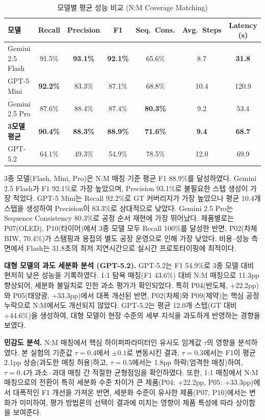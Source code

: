 \documentclass[conference]{IEEEtran}
\begin{document}
\begin{table}[!t]
\caption{모델별 평균 성능 비교 (N:M Coverage Matching)}
\label{tab:model_performance}
\centering
\begin{tabular}{l c c c c c c}
\hline
\textbf{모델} & \textbf{Recall} & \textbf{Precision} & \textbf{F1} & \textbf{Seq.\ Cons.} & \textbf{Avg.\ Steps} & \textbf{Latency (s)} \\
\hline
Gemini 2.5 Flash & 91.5\% & \textbf{93.1\%} & \textbf{92.1\%} & 65.6\% & 8.7 & \textbf{31.8} \\
GPT-5 Mini & \textbf{92.2\%} & 83.3\% & 87.1\% & 68.8\% & 10.4 & 120.9 \\
Gemini 2.5 Pro & 87.6\% & 88.4\% & 87.4\% & \textbf{80.3\%} & 9.2 & 53.4 \\
\hline
\textbf{3모델 평균} & \textbf{90.4\%} & \textbf{88.3\%} & \textbf{88.9\%} & \textbf{71.6\%} & \textbf{9.4} & \textbf{68.7} \\
\hline
GPT-5.2 & 64.1\% & 49.3\% & 54.9\% & 78.5\% & 12.0 & 69.9 \\
\hline
\end{tabular}
\end{table}

3종 모델(Flash, Mini, Pro)은 N:M 매칭 기준 평균 F1 88.9\%를 달성하였다. Gemini 2.5 Flash가 F1 92.1\%로 가장 높았으며, Precision 93.1\%로 불필요한 스텝 생성이 가장 적었다. GPT-5 Mini는 Recall 92.2\%로 GT 커버리지가 가장 높았으나 평균 10.4개 스텝을 생성하여 Precision이 83.3\%로 상대적으로 낮았다. Gemini 2.5 Pro는 Sequence Consistency 80.3\%로 공정 순서 재현에 가장 뛰어났다. 제품별로는 P07(OLED), P10(타이어)에서 3종 모델 모두 Recall 100\%를 달성한 반면, P02(차체 BIW, 70.4\%)가 스탬핑과 용접의 별도 공장 운영으로 인해 가장 낮았다. 비용--성능 측면에서 Flash는 31.8초의 최저 지연시간으로 실시간 프로토타이핑에 최적이다.

\textbf{대형 모델의 과도 세분화 분석 (GPT-5.2).}
GPT-5.2는 F1 54.9\%로 3종 모델 대비 현저히 낮은 성능을 기록하였다. 1:1 탐욕 매칭(F1 43.6\%) 대비 N:M 매칭으로 11.3pp 향상되어, 세분화 불일치로 인한 과소 평가가 확인되었다. 특히 P04(반도체, +22.2pp)와 P05(태양광, +33.3pp)에서 대폭 개선된 반면, P02(차체)와 P09(제약)는 핵심 공정 누락으로 N:M에서도 개선되지 않았다. GPT-5.2는 평균 12.0개 스텝(GT 대비 +44.6\%)을 생성하여, 대형 모델이 현장 수준의 세부 지식을 과도하게 반영하는 경향을 보였다.

\textbf{민감도 분석.}
N:M 매칭에서 핵심 하이퍼파라미터인 유사도 임계값 $\tau$의 영향을 분석하였다. 본 실험의 기준값 $\tau{=}0.4$에서 $\pm0.1$로 변동시킨 결과, $\tau{=}0.3$에서는 F1이 평균 2.1pp 상승(과도한 매칭 허용)하고, $\tau{=}0.5$에서는 1.8pp 하락(엄격한 매칭)하여, $\tau{=}0.4$가 과소\,$\cdot$\,과대 매칭 간 적절한 균형점임을 확인하였다. 또한, 1:1 매칭에서 N:M 매칭으로의 전환이 특히 세분화 수준 차이가 큰 제품(P04: +22.2pp, P05: +33.3pp)에서 대폭적인 F1 개선을 가져온 반면, 세분화 수준이 유사한 제품(P07, P10)에서는 변화가 미미하여, 평가 방법론의 선택이 결과에 미치는 영향이 제품 특성에 따라 상이함을 보여준다.
\end{document}
